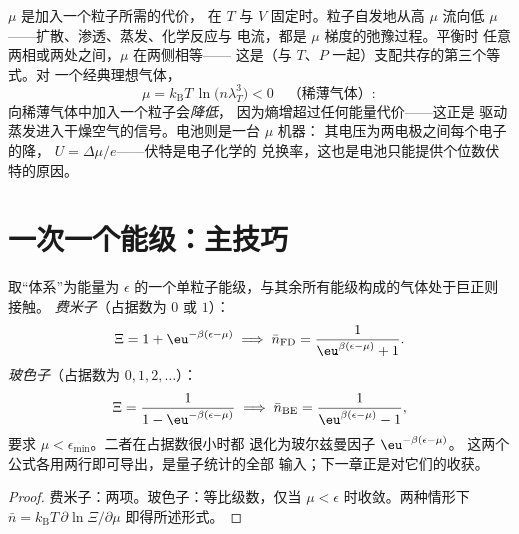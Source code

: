 \begin{definition}[$\mu$ 的含义]\label{def:b3:grand-canonical:mu}
$\mu$ 是加入一个粒子所需的代价，
在 $T$ 与 $V$ 固定时。粒子自发地从高 $\mu$ 流向低
$\mu$——扩散、渗透、蒸发、化学反应与
电流，都是 $\mu$ 梯度的弛豫过程。平衡时
任意两相或两处之间，$\mu$ 在两侧相等——
这是（与 $T$、$P$ 一起）支配共存的第三个等式。对
一个经典理想气体，
\[
\mu = k_{\text{B}}T\,\ln\!\big(n\lambda_T^3\big) < 0
\quad\text{（稀薄气体）} :
\]
向稀薄气体中加入一个粒子会\emph{降低}，
因为熵增超过任何能量代价——这正是
驱动蒸发进入干燥空气的信号。电池则是一台 $\mu$ 机器：
其电压为两电极之间每个电子的降，
$U = \Delta\mu/e$——伏特是电子化学的
兑换率，这也是电池只能提供个位数伏特的原因。
\end{definition}

\section{一次一个能级：主技巧}

\begin{theorem}[单个量子能级的占据数]\label{thm:b3:grand-canonical:occupation}
取“体系”为能量为
$\epsilon$ 的一个单粒子能级，与其余所有能级构成的气体处于巨正则接触。
\emph{费米子}（占据数为 $0$ 或 $1$）：
\[
\Xi = 1 + \eu^{-\beta(\epsilon - \mu)}
\;\Longrightarrow\;
\bar n_{\text{FD}} = \frac{1}{\eu^{\beta(\epsilon - \mu)} + 1} .
\]
\emph{玻色子}（占据数为 $0, 1, 2, \dots$）：
\[
\Xi = \frac{1}{1 - \eu^{-\beta(\epsilon - \mu)}}
\;\Longrightarrow\;
\bar n_{\text{BE}} = \frac{1}{\eu^{\beta(\epsilon - \mu)} - 1} ,
\]
要求 $\mu < \epsilon_{\min}$。二者在占据数很小时都
退化为玻尔兹曼因子 $\eu^{-\beta(\epsilon - \mu)}$。
这两个公式各用两行即可导出，是量子统计的全部
输入；下一章正是对它们的收获。
\end{theorem}

\begin{proof}
费米子：两项。玻色子：等比级数，仅当
$\mu < \epsilon$ 时收敛。两种情形下 $\bar n = k_{\text{B}}T\,
\partial\ln\Xi/\partial\mu$ 即得所述形式。
\end{proof}

